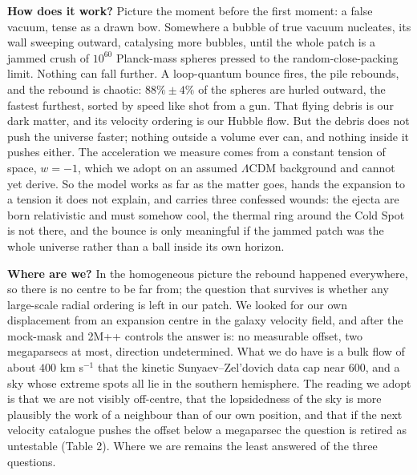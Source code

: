 \documentclass[
]{article}
\begin{document}
\textbf{How does it work?} Picture the moment before the first moment: a
false vacuum, tense as a drawn bow. Somewhere a bubble of true vacuum
nucleates, its wall sweeping outward, catalysing more bubbles, until the
whole patch is a jammed crush of \(10^{60}\) Planck-mass spheres pressed
to the random-close-packing limit. Nothing can fall further. A
loop-quantum bounce fires, the pile rebounds, and the rebound is
chaotic: \(88\% \pm 4\%\) of the spheres are hurled outward, the fastest
furthest, sorted by speed like shot from a gun. That flying debris is
our dark matter, and its velocity ordering is our Hubble flow. But the
debris does not push the universe faster; nothing outside a volume ever
can, and nothing inside it pushes either. The acceleration we measure
comes from a constant tension of space, \(w = -1\), which we adopt on an
assumed \(\Lambda\)CDM background and cannot yet derive. So the model
works as far as the matter goes, hands the expansion to a tension it
does not explain, and carries three confessed wounds: the ejecta are
born relativistic and must somehow cool, the thermal ring around the
Cold Spot is not there, and the bounce is only meaningful if the jammed
patch was the whole universe rather than a ball inside its own horizon.

\textbf{Where are we?} In the homogeneous picture the rebound happened
everywhere, so there is no centre to be far from; the question that
survives is whether any large-scale radial ordering is left in our
patch. We looked for our own displacement from an expansion centre in
the galaxy velocity field, and after the mock-mask and 2M++ controls the
answer is: no measurable offset, two megaparsecs at most, direction
undetermined. What we do have is a bulk flow of about \(400\) km
s\(^{-1}\) that the kinetic Sunyaev--Zel'dovich data cap near \(600\),
and a sky whose extreme spots all lie in the southern hemisphere. The
reading we adopt is that we are not visibly off-centre, that the
lopsidedness of the sky is more plausibly the work of a neighbour than
of our own position, and that if the next velocity catalogue pushes the
offset below a megaparsec the question is retired as untestable (Table
2). Where we are remains the least answered of the three questions.
\end{document}
